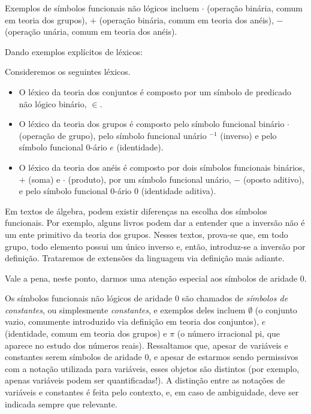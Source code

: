 Exemplos de símbolos funcionais não lógicos incluem $\cdot$ (operação binária, comum em teoria dos grupos), $+$ (operação binária, comum em teoria dos anéis), $-$ (operação unária, comum em teoria dos anéis).

Dando exemplos explícitos de léxicos:
\begin{example}Consideremos os seguintes léxicos.\label{exa:exemplosLexicos}
    \begin{itemize}
        \item O léxico da teoria dos conjuntos é composto por um símbolo de predicado não lógico binário, $\in$.
        \item O léxico da teoria dos grupos é composto pelo símbolo funcional binário $\cdot$ (operação de grupo), pelo símbolo funcional unário $^{-1}$ (inverso) e pelo símbolo funcional $0$-ário $e$ (identidade).
        \item O léxico da teoria dos anéis é composto por dois símbolos funcionais binários, $+$ (soma) e $\cdot$ (produto), por um símbolo funcional unário, $-$ (oposto aditivo), e pelo símbolo funcional $0$-ário $0$ (identidade aditiva).
    \end{itemize}
\end{example}
Em textos de álgebra, podem existir diferenças na escolha dos símbolos funcionais.
Por exemplo, alguns livros podem dar a entender que a inversão não é um ente primitivo da teoria dos grupos.
Nesses textos, prova-se que, em todo grupo, todo elemento possui um único inverso e, então, introduz-se a inversão por definição.
Trataremos de extensões da linguagem via definição mais adiante.

Vale a pena, neste ponto, darmos uma atenção especial aos símbolos de aridade $0$.

Os símbolos funcionais não lógicos de aridade $0$ são chamados de \emph{símbolos de constantes}, ou simplesmente \emph{constantes}, e exemplos deles incluem $\emptyset$ (o conjunto vazio, comumente introduzido via definição em teoria dos conjuntos), $e$ (identidade, comum em teoria dos grupos) e $\pi$ (o número irracional pi, que aparece no estudo dos números reais).
Ressaltamos que, apesar de variáveis e constantes serem símbolos de aridade $0$, e apesar de estarmos sendo permissivos com a notação utilizada para variáveis, esses objetos são distintos (por exemplo, apenas variáveis podem ser quantificadas!).
A distinção entre as notações de variáveis e constantes é feita pelo contexto, e, em caso de ambiguidade, deve ser indicada sempre que relevante.

